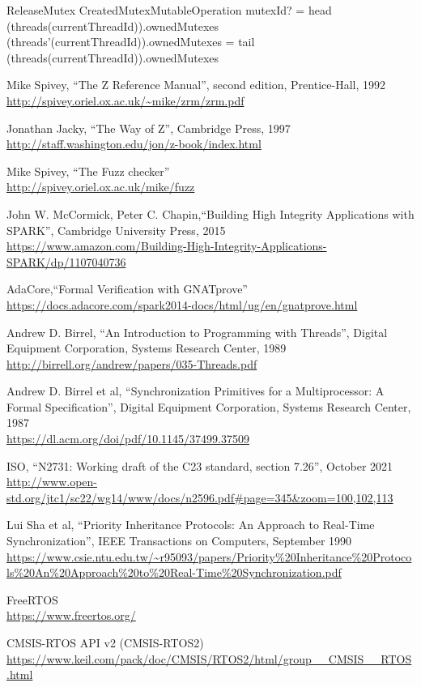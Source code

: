 \documentclass[11pt,letterpaper,twoside,openany]{book}
\begin{document}
\begin{schema}{ReleaseMutex}
   CreatedMutexMutableOperation
\where
mutexId? = head~ (threads(currentThreadId)).ownedMutexes
\also
(threads'(currentThreadId)).ownedMutexes = tail~ (threads(currentThreadId)).ownedMutexes
\end{schema}

\begin{thebibliography}{9}

Mike Spivey, ``The Z Reference Manual'', second edition, Prentice-Hall, 1992 \\
\url{http://spivey.oriel.ox.ac.uk/~mike/zrm/zrm.pdf}

Jonathan Jacky, ``The Way of Z'', Cambridge Press, 1997 \\
\url{http://staff.washington.edu/jon/z-book/index.html}

Mike Spivey, ``The Fuzz checker'' \\
\url{http://spivey.oriel.ox.ac.uk/mike/fuzz}

John W. McCormick, Peter C. Chapin,``Building High Integrity Applications with SPARK'', Cambridge University Press, 2015 \\
\url{https://www.amazon.com/Building-High-Integrity-Applications-SPARK/dp/1107040736}

AdaCore,``Formal Verification with GNATprove'' \\
\url{https://docs.adacore.com/spark2014-docs/html/ug/en/gnatprove.html}

Andrew D. Birrel, ``An Introduction to Programming with Threads'',
Digital Equipment Corporation, Systems Research Center, 1989 \\
\url{http://birrell.org/andrew/papers/035-Threads.pdf}

Andrew D. Birrel et al, ``Synchronization Primitives for a Multiprocessor: A Formal Specification'',
Digital Equipment Corporation, Systems Research Center, 1987 \\
\url{https://dl.acm.org/doi/pdf/10.1145/37499.37509}

ISO, ``N2731: Working draft of the C23 standard, section 7.26'', October 2021 \\
\url{http://www.open-std.org/jtc1/sc22/wg14/www/docs/n2596.pdf#page=345&zoom=100,102,113}

Lui Sha et al, ``Priority Inheritance Protocols: An Approach to Real-Time Synchronization'', IEEE Transactions on Computers, September 1990 \\
\url{https://www.csie.ntu.edu.tw/~r95093/papers/Priority%20Inheritance%20Protocols%20An%20Approach%20to%20Real-Time%20Synchronization.pdf}

FreeRTOS \\
\url{https://www.freertos.org/}

CMSIS-RTOS API v2 (CMSIS-RTOS2) \\
\url{https://www.keil.com/pack/doc/CMSIS/RTOS2/html/group__CMSIS__RTOS.html}

\end{thebibliography}
\end{document}
